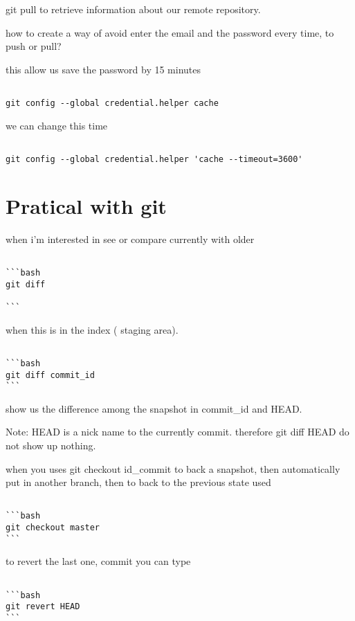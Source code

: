 \documentclass[10pt,a4paper]{article}
\begin{document}
git pull to retrieve information about our remote repository.

how to create a way of avoid enter the email and the password every time, to push or pull?

this allow us save the password by 15 minutes
\begin{verbatim}
 
git config --global credential.helper cache 

\end{verbatim}

we can change this time
\begin{verbatim}
 
git config --global credential.helper 'cache --timeout=3600'

\end{verbatim}

\section{Pratical with git}

when i'm interested in see or compare currently with older 
\begin{verbatim}

```bash
git diff

```

\end{verbatim}
when this is in the index ( staging area).

\begin{verbatim}

```bash
git diff commit_id
```
\end{verbatim}
show us the difference among the snapshot in commit_id  and HEAD.

Note: HEAD is a nick name to the currently commit.
therefore git diff HEAD do not show up nothing.


when you uses git checkout id\_commit to back a snapshot, then automatically 
put in another branch, then to back to the previous state used 

\begin{verbatim}

```bash 
git checkout master
```

\end{verbatim}

to revert the last one, commit you can type 
\begin{verbatim}

```bash
git revert HEAD
```

\end{verbatim}
\end{document}
